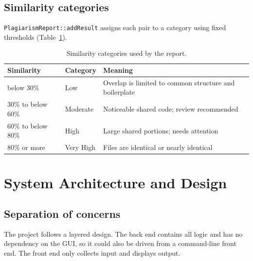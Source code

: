 \documentclass[11pt,a4paper]{report}
\newcommand{\cc}[1]{\texttt{#1}}
\begin{document}
\subsection{Similarity categories}
\cc{PlagiarismReport::addResult} assigns each pair to a category using fixed thresholds
(Table~\ref{tab:categories}).

\begin{table}[htbp]
\centering
\begin{tabular}{@{}l l p{8.2cm}@{}}
\toprule
Similarity & Category & Meaning \\
\midrule
below 30\%            & Low       & Overlap is limited to common structure and boilerplate \\
30\% to below 60\%    & Moderate  & Noticeable shared code; review recommended \\
60\% to below 80\%    & High      & Large shared portions; needs attention \\
80\% or more          & Very High & Files are identical or nearly identical \\
\bottomrule
\end{tabular}
\caption{Similarity categories used by the report.}
\label{tab:categories}
\end{table}

\section{System Architecture and Design}

\subsection{Separation of concerns}
The project follows a layered design. The back end contains all logic and has no dependency
on the GUI, so it could also be driven from a command-line front end. The front end only
collects input and displays output.
\end{document}
